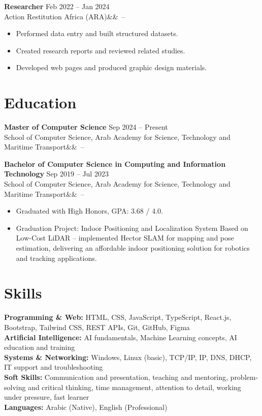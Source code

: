 \documentclass[letterpaper,11pt]{article}
\newcommand{\job}[4]{%
  \textbf{#1} \hfill #4\\
  #2\ifx&#3&\else\ -- #3\fi\par\vspace{1pt}}
\begin{document}
\job{Researcher}{Action Restitution Africa (ARA)}{}{Feb 2022 -- Jan 2024}
\begin{itemize}
  \item Performed data entry and built structured datasets.
  \item Created research reports and reviewed related studies.
  \item Developed web pages and produced graphic design materials.
\end{itemize}

\section{Education}

\job{Master of Computer Science}{School of Computer Science, Arab Academy for Science, Technology and Maritime Transport}{}{Sep 2024 -- Present}

\vspace{4pt}
\job{Bachelor of Computer Science in Computing and Information Technology}{School of Computer Science, Arab Academy for Science, Technology and Maritime Transport}{}{Sep 2019 -- Jul 2023}
\begin{itemize}
  \item Graduated with High Honors, GPA: 3.68 / 4.0.
  \item Graduation Project: Indoor Positioning and Localization System Based
        on Low-Cost LiDAR -- implemented Hector SLAM for mapping and pose
        estimation, delivering an affordable indoor positioning solution for
        robotics and tracking applications.
\end{itemize}

\section{Skills}
\textbf{Programming \& Web:} HTML, CSS, JavaScript, TypeScript, React.js,
Bootstrap, Tailwind CSS, REST APIs, Git, GitHub, Figma\\
\textbf{Artificial Intelligence:} AI fundamentals, Machine Learning concepts,
AI education and training\\
\textbf{Systems \& Networking:} Windows, Linux (basic), TCP/IP, IP, DNS, DHCP,
IT support and troubleshooting\\
\textbf{Soft Skills:} Communication and presentation, teaching and mentoring,
problem-solving and critical thinking, time management, attention to detail,
working under pressure, fast learner\\
\textbf{Languages:} Arabic (Native), English (Professional)
\end{document}
